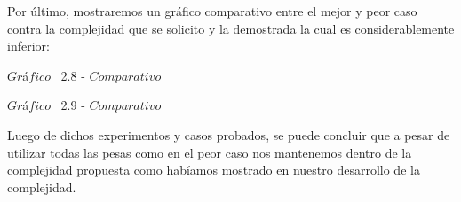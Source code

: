 Por \'ultimo, mostraremos un gr\'afico comparativo entre el mejor y peor caso contra la complejidad que se solicito y la demostrada la cual es considerablemente inferior:\\

\vspace*{0.3cm} \vspace*{0.3cm}
  \begin{center}
 {$Gr$\'a$fico$ \ 2.8 - $Comparativo$}
  \end{center}
  \vspace*{0.3cm}
  
  \vspace*{0.3cm} \vspace*{0.3cm}
  \begin{center}
 {$Gr$\'a$fico$ \ 2.9 - $Comparativo$}
  \end{center}
  \vspace*{0.3cm}

Luego de dichos experimentos y casos probados, se puede concluir que a pesar de utilizar todas las pesas como en el peor caso nos mantenemos dentro de la complejidad propuesta como hab\'iamos mostrado en nuestro desarrollo de la complejidad.\\
